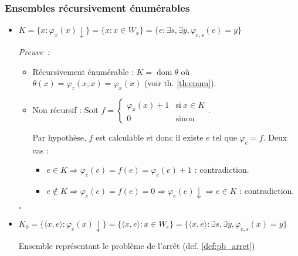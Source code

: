 \documentclass{book}
\theoremstyle{definition}
\numberwithin{lemma}{subsection}
\numberwithin{theorem}{subsection}
\numberwithin{definition}{subsection}
\numberwithin{proposition}{subsection}
\numberwithin{corollary}{subsection}
\numberwithin{property}{subsection}
\numberwithin{example}{subsection}
\numberwithin{heuristique}{subsection}
\numberwithin{scenario}{subsection}
\newenvironment{proofi} {\noindent\emph{Preuve~:}} {\hfill $\square$\vspace{0.2cm}}
\newcommand{\GodelFunc}[1]{\varphi_{#1}}
\newcommand{\Pairing}[1]{\langle #1 \rangle}
\DeclareMathOperator{\dom}{dom}
\begin{document}
        \subsubsection{Ensembles récursivement énumérables}
            \begin{itemize}
                \item $K = \{x:\GodelFunc{x}(x)\downarrow\} = \{x:x \in W_x\} = \{e : \exists s, \exists y, \GodelFunc{e,s}(e) = y\}$
                    \par \begin{proofi}
                        \begin{itemize}
                            \item Récursivement énumérable : $K = \dom \theta $ où $ \theta(x) = \GodelFunc{z}(x,x) = \GodelFunc{x}(x)$ (voir th. \ref{th:enum}).
                            \item Non récursif : Soit $f = \begin{cases}
                                \GodelFunc{x}(x)+1 & \mathrm{ si~ } x \in K \\
                                0 & \mathrm{sinon}
                            \end{cases}$.
                            \par Par hypothèse, $f$ est calculable et donc il existe $e$ tel que $\GodelFunc{e} = f$. Deux cas :
                            \begin{itemize}
                                \item $e \in K \Rightarrow \GodelFunc{e}(e) = f(e) = \GodelFunc{e}(e)+1$ : contradiction.
                                \item $e \not\in K \Rightarrow \GodelFunc{e}(e) = f(e) = 0 \Rightarrow \GodelFunc{e}(e)\downarrow \Rightarrow e \in K$ : contradiction.
                            \end{itemize}
                            \vspace{-\baselineskip}
                        \end{itemize}
                        \vspace{-\baselineskip}
                    \end{proofi}
                \item $K_0 = \{\Pairing{x, e}:\GodelFunc{e}(x)\downarrow\} = \{\Pairing{x, e}:x \in W_e\} = \{\Pairing{x,e} : \exists s, \exists y, \GodelFunc{e,s}(x) = y\}$ 
                \par Ensemble représentant le problème de l'arrêt (def. \ref{def:pb_arret})

\end{itemize}
\end{document}
